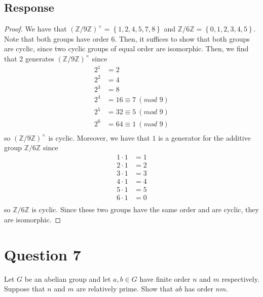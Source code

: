 \documentclass[13pt]{article}
\begin{document}
\subsection*{Response}
\begin{proof}
    We have that $(\mathbb{Z}/9\mathbb{Z})^{\times} = \left\{ 1, 2, 4, 5, 7, 8 \right\}$ and
    $\mathbb{Z}/6\mathbb{Z} = \left\{ 0, 1, 2, 3, 4, 5 \right\}$. Note that both groups have
    order $6$. Then, it suffices to show that both groups are cyclic, since two cyclic groups of
    equal order are isomorphic. Then, we find that $2$ generates $(\mathbb{Z}/9\mathbb{Z})^{\times}$
    since
    \begin{align*}
        2^1 &= 2 \\
        2^2 &= 4 \\
        2^3 &= 8 \\
        2^4 &= 16 \equiv 7 \ (\textit{mod } 9) \\
        2^5 &= 32 \equiv 5 \ (\textit{mod } 9) \\
        2^6 &= 64 \equiv 1 \ (\textit{mod } 9) \\
    \end{align*}
    so $(\mathbb{Z}/9\mathbb{Z})^{\times}$ is cyclic. Moreover, we have that $1$ is a generator
    for the additive group $\mathbb{Z}/6\mathbb{Z}$ since
    \begin{align*}
        1 \cdot 1 &= 1 \\
        2 \cdot 1 &= 2 \\
        3 \cdot 1 &= 3 \\
        4 \cdot 1 &= 4 \\
        5 \cdot 1 &= 5 \\
        6 \cdot 1 &= 0 \\
    \end{align*}
    so $\mathbb{Z}/6\mathbb{Z}$ is cyclic. Since these two groups have the same order and
    are cyclic, they are isomorphic.
\end{proof}





\newpage
\section*{Question 7}
Let $G$ be an abelian group and let $a, b \in G$ have finite order $n$ and $m$
respectively. Suppose that $n$ and $m$ are relatively prime. Show that $ab$ has order $nm$.
\end{document}
